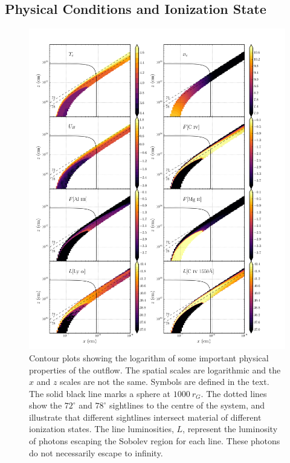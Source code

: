 \documentclass[useAMS,usenatbib]{mn2e_x}
\begin{document}
\subsection{Physical Conditions and Ionization State}


\begin{figure}
\centering
\includegraphics[width=1.0\textwidth]{figures/link8.png}
\caption
{
Contour plots showing the logarithm of some important 
physical properties of the outflow. The spatial scales are
logarithmic and the $x$ and $z$ scales are not the same.
Symbols are defined in the text.
The solid black line marks a sphere at $1000~r_G$.
The dotted lines show the $72^\circ$ and $78^\circ$ sightlines 
to the centre of the system, and illustrate that different sightlines
intersect material of different ionization states.
The line luminosities, $L$, represent the luminosity of photons
escaping the Sobolev region for each line. These photons do not
necessarily escape to infinity.
}
\label{fig:wind}
\end{figure}
\end{document}
